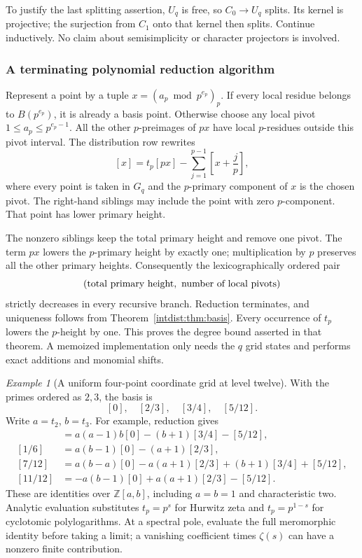 \documentclass[11pt,a4paper]{article}
\numberwithin{equation}{section}
\theoremstyle{plain}
\theoremstyle{definition}
\theoremstyle{remark}
\newtheorem{example}[theorem]{Example}
\begin{document}
To justify the last splitting assertion, $U_q$ is free, so
$C_0\to U_q$ splits. Its kernel is projective; the surjection from
$C_1$ onto that kernel then splits. Continue inductively. No claim about
semisimplicity or character projectors is involved.

\subsubsection{A terminating polynomial reduction algorithm}

Represent a point by a tuple $x=(a_p\bmod p^{e_p})_p$. If every local
residue belongs to $B(p^{e_p})$, it is already a basis point. Otherwise
choose any local pivot $1\le a_p\le p^{e_p-1}$. All the other
$p$-preimages of $p x$ have local $p$-residues outside this pivot
interval. The distribution row rewrites
\begin{equation}\label{intdist:eq:rewrite}
 [x]=t_p[p x]-
 \sum_{j=1}^{p-1}
 \left[x+\frac{j}{p}\right],
\end{equation}
where every point is taken in $G_q$ and the $p$-primary component of
$x$ is the chosen pivot. The right-hand siblings may include the point
with zero $p$-component. That point has lower primary height.

The nonzero siblings keep the total primary height and remove one
pivot. The term $p x$ lowers the $p$-primary height by exactly one;
multiplication by $p$ preserves all the other primary heights.
Consequently the lexicographically ordered pair
\[
 (\hbox{total primary height},\ \hbox{number of local pivots})
\]
strictly decreases in every recursive branch. Reduction terminates,
and uniqueness follows from Theorem~\ref{intdist:thm:basis}. Every
occurrence of $t_p$ lowers the $p$-height by one. This proves the degree
bound asserted in that theorem. A memoized implementation only needs
the $q$ grid states and performs exact additions and monomial shifts.

\begin{example}[A uniform four-point coordinate grid at level twelve]
With the primes ordered as $2,3$, the basis is
\[
 [0],\quad[2/3],\quad[3/4],\quad[5/12].
\]
Write $a=t_2$, $b=t_3$. For example, reduction gives
\begin{align}
 [1/12]&=a(a-1)b[0]-(b+1)[3/4]-[5/12],\label{intdist:eq:q12-one}\\
 [1/6]&=a(b-1)[0]-(a+1)[2/3],\\
 [7/12]&=a(b-a)[0]-a(a+1)[2/3]+(b+1)[3/4]+[5/12],\\
 [11/12]&=-a(b-1)[0]+a(a+1)[2/3]-[5/12].
\end{align}
These are identities over $\mathbb Z[a,b]$, including $a=b=1$ and
characteristic two. Analytic evaluation substitutes $t_p=p^s$ for
Hurwitz zeta and $t_p=p^{1-s}$ for cyclotomic polylogarithms. At a
spectral pole, evaluate the full meromorphic identity before taking a
limit; a vanishing coefficient times $\zeta(s)$ can have a nonzero
finite contribution.
\end{example}
\end{document}

